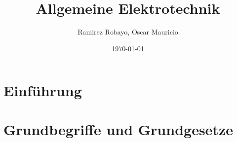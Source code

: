 \documentclass[10pt, a4paper]{report}
\title{Allgemeine Elektrotechnik}
\author{Ramirez Robayo, Oscar Mauricio}
\date{\today}
\begin{document}



\chapter{Einführung}

\chapter{Grundbegriffe und Grundgesetze}

\end{document}
